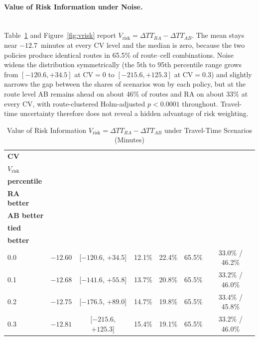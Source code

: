 \documentclass[11pt,a4paper]{article}
\begin{document}
\paragraph{Value of Risk Information under Noise.}\mbox{}\\
Table~\ref{tab:vrisk} and Figure~\ref{fig:vrisk} report $V_{\text{risk}} = \Delta TT_{RA} - \Delta TT_{AB}$. The mean stays near $-12.7$~minutes at every CV level and the median is zero, because the two policies produce identical routes in 65.5\% of route--cell combinations. Noise widens the distribution symmetrically (the 5th to 95th percentile range grows from $[-120.6, +34.5]$ at $\mathrm{CV}=0$ to $[-215.6, +125.3]$ at $\mathrm{CV}=0.3$) and slightly narrows the gap between the shares of scenarios won by each policy, but at the route level AB remains ahead on about 46\% of routes and RA on about 33\% at every CV, with route-clustered Holm-adjusted $p < 0.0001$ throughout. Travel-time uncertainty therefore does not reveal a hidden advantage of risk weighting.

\begin{table}[htbp]
\centering
\caption{Value of Risk Information $V_{\text{risk}} = \Delta TT_{RA} - \Delta TT_{AB}$ under Travel-Time Scenarios (Minutes)}
\label{tab:vrisk}
\scriptsize
\setlength{\tabcolsep}{3pt}
\renewcommand{\arraystretch}{1.15}
\begin{tabular}{lcccccc}
\toprule
\textbf{CV} & \shortstack{\textbf{Mean}\\\textbf{$V_{\text{risk}}$}} & \shortstack{\textbf{5th--95th}\\\textbf{percentile}} & \shortstack{\textbf{Scenarios}\\\textbf{RA better}} & \shortstack{\textbf{Scenarios}\\\textbf{AB better}} & \shortstack{\textbf{Scenarios}\\\textbf{tied}} & \shortstack{\textbf{Routes RA / AB}\\\textbf{better}} \\
\midrule
0.0 & $-12.60$ & [$-120.6$, $+34.5$] & 12.1\% & 22.4\% & 65.5\% & 33.0\% / 46.2\% \\
0.1 & $-12.68$ & [$-141.6$, $+55.8$] & 13.7\% & 20.8\% & 65.5\% & 33.2\% / 46.0\% \\
0.2 & $-12.75$ & [$-176.5$, $+89.0$] & 14.7\% & 19.8\% & 65.5\% & 33.4\% / 45.8\% \\
0.3 & $-12.81$ & [$-215.6$, $+125.3$] & 15.4\% & 19.1\% & 65.5\% & 33.2\% / 46.0\% \\
\bottomrule
\end{tabular}
\end{table}
\end{document}
